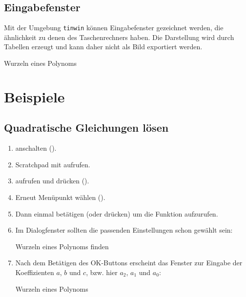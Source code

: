 \documentclass[11pt, a4paper]{scrartcl}
\begin{document}
\subsection{Eingabefenster}
Mit der Umgebung \texttt{tinwin} können Eingabefenster gezeichnet werden, die ähnlichkeit zu denen des Taschenrechners haben. Die Darstellung wird durch Tabellen erzeugt und kann daher nicht als Bild exportiert werden.
\begin{center}
	\begin{tinwindow}{Wurzeln eines Polynoms}
	\end{tinwindow}
\end{center}

\begin{center}
	\begin{tinwin}
	\end{tinwin}
\end{center}

\section{Beispiele}
\subsection{Quadratische Gleichungen lösen}
\begin{enumerate}
	\item \TIN anschalten (\TINon*).
	\item Scratchpad mit \TINscratch* aufrufen.
	\item \TINmenu* aufrufen und  drücken ().
	\item Erneut Menüpunkt  wählen ().
	\item Dann einmal \TINenter* betätigen (oder  drücken) um die Funktion  aufzurufen.
	\item Im Dialogfenster sollten die passenden Einstellungen schon gewählt sein:
	\begin{center}
		\begin{tinwindow}{Wurzeln eines Polynoms finden}
		\end{tinwindow}
	\end{center}
	\item Nach dem Betätigen des OK-Buttons erscheint das Fenster zur Eingabe der Koeffizienten $a$, $b$ und $c$, bzw. hier $a_2$, $a_1$ und $a_0$:
	\begin{center}
		\begin{tinwindow}{Wurzeln eines Polynoms}
		\end{tinwindow}
	\end{center}
\end{enumerate}
\end{document}

